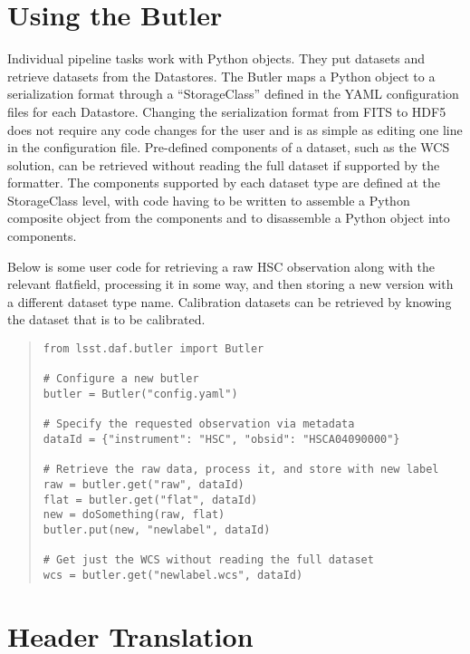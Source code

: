 \documentclass[11pt,twoside]{article}
\begin{document}
\section{Using the Butler}
\label{sec:using}

Individual pipeline tasks work with Python objects.
They put datasets and retrieve datasets from the Datastores.
The Butler maps a Python object  to  a serialization format through a ``StorageClass'' defined in the YAML configuration files for each Datastore.
Changing the serialization format from FITS to HDF5 does not require any code changes for the user and is as simple as editing one line in the configuration file.
Pre-defined components of a dataset, such as the WCS solution, can be retrieved without reading the full dataset if supported by the formatter.
The components supported by each dataset type are defined at the StorageClass level, with code having to be written to assemble a Python composite object from the components and to disassemble a Python object into components.

Below is some user code for retrieving a raw HSC observation along with the relevant flatfield, processing it in some way, and then storing a new version with a different dataset type name.
Calibration datasets can be retrieved by knowing the dataset that is to be calibrated.

\begin{quote}
\begin{small}
\begin{verbatim}
from lsst.daf.butler import Butler

# Configure a new butler
butler = Butler("config.yaml")

# Specify the requested observation via metadata
dataId = {"instrument": "HSC", "obsid": "HSCA04090000"}

# Retrieve the raw data, process it, and store with new label
raw = butler.get("raw", dataId)
flat = butler.get("flat", dataId)
new = doSomething(raw, flat)
butler.put(new, "newlabel", dataId)

# Get just the WCS without reading the full dataset
wcs = butler.get("newlabel.wcs", dataId)
\end{verbatim}
\end{small}
\end{quote}

\section{Header Translation}
\end{document}
